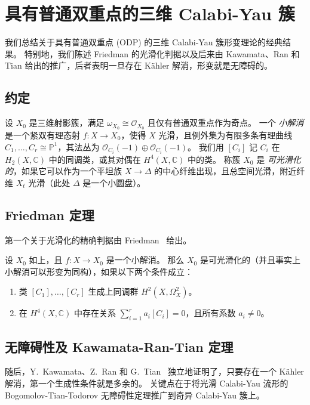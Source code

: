 \chapter{具有普通双重点的三维 Calabi-Yau 簇}

我们总结关于具有普通双重点 (ODP) 的三维 Calabi-Yau 簇形变理论的经典结果。
特别地，我们陈述 Friedman 的光滑化判据以及后来由 Kawamata、Ran 和 Tian 给出的推广，后者表明一旦存在 Kähler 解消，形变就是无障碍的。

\section{约定}
设 \(X_0\) 是三维射影簇，满足 \(\omega_{X_0}\cong\mathcal{O}_{X_0}\) 且仅有普通双重点作为奇点。
一个 \emph{小解消} 是一个紧双有理态射 \(f\colon X\to X_0\)，使得 \(X\) 光滑，且例外集为有限多条有理曲线 \(C_1,\dots,C_r\cong\mathbb{P}^1\)，其法丛为 \(\mathcal{O}_{C_i}(-1)\oplus\mathcal{O}_{C_i}(-1)\)。
我们用 \([C_i]\) 记 \(C_i\) 在 \(H_2(X,\mathbb{C})\) 中的同调类，或其对偶在 \(H^4(X,\mathbb{C})\) 中的类。
称簇 \(X_0\) 是 \emph{可光滑化的}，如果它可以作为一个平坦族 \(X\to\Delta\) 的中心纤维出现，且总空间光滑，附近纤维 \(X_t\) 光滑（此处 \(\Delta\) 是一个小圆盘）。

\section{Friedman 定理}
第一个关于光滑化的精确判据由 Friedman~\cite{Friedman1986} 给出。

\begin{theorem}[Friedman, 1986]
设 \(X_0\) 如上，且 \(f\colon X\to X_0\) 是一个小解消。
那么 \(X_0\) 是可光滑化的（并且事实上小解消可以形变为同构），如果以下两个条件成立：
\begin{enumerate}
    \item 类 \([C_1],\dots,[C_r]\) 生成上同调群 \(H^2(X,\Omega_X^2)\)。
    \item 在 \(H^4(X,\mathbb{C})\) 中存在关系 \(\sum_{i=1}^r a_i[C_i]=0\)，且所有系数 \(a_i\neq 0\)。
\end{enumerate}
\end{theorem}

\section{无障碍性及 Kawamata-Ran-Tian 定理}
随后，Y.\ Kawamata、Z.\ Ran 和 G.\ Tian~\cite{Kawamata,Ran,Tian} 独立地证明了，只要存在一个 Kähler 解消，第一个生成性条件就是多余的。
关键点在于将光滑 Calabi-Yau 流形的 Bogomolov-Tian-Todorov 无障碍性定理推广到奇异 Calabi-Yau 簇上。

